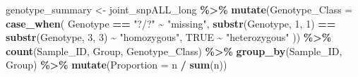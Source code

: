 \documentclass[
]{article}
\newenvironment{Shaded}{\begin{snugshade}}{\end{snugshade}}
\newcommand{\AttributeTok}[1]{\textcolor[rgb]{0.13,0.29,0.53}{#1}}
\newcommand{\ConstantTok}[1]{\textcolor[rgb]{0.56,0.35,0.01}{#1}}
\newcommand{\DecValTok}[1]{\textcolor[rgb]{0.00,0.00,0.81}{#1}}
\newcommand{\FunctionTok}[1]{\textcolor[rgb]{0.13,0.29,0.53}{\textbf{#1}}}
\newcommand{\NormalTok}[1]{#1}
\newcommand{\OtherTok}[1]{\textcolor[rgb]{0.56,0.35,0.01}{#1}}
\newcommand{\SpecialCharTok}[1]{\textcolor[rgb]{0.81,0.36,0.00}{\textbf{#1}}}
\newcommand{\StringTok}[1]{\textcolor[rgb]{0.31,0.60,0.02}{#1}}
\begin{document}
\begin{Shaded}
\begin{Highlighting}[]
\NormalTok{genotype\_summary }\OtherTok{\textless{}{-}}\NormalTok{ joint\_snpALL\_long }\SpecialCharTok{\%\textgreater{}\%}
  \FunctionTok{mutate}\NormalTok{(}\AttributeTok{Genotype\_Class =} \FunctionTok{case\_when}\NormalTok{(}
\NormalTok{    Genotype }\SpecialCharTok{==} \StringTok{"?/?"} \SpecialCharTok{\textasciitilde{}} \StringTok{"missing"}\NormalTok{,}
    \FunctionTok{substr}\NormalTok{(Genotype, }\DecValTok{1}\NormalTok{, }\DecValTok{1}\NormalTok{) }\SpecialCharTok{==} \FunctionTok{substr}\NormalTok{(Genotype, }\DecValTok{3}\NormalTok{, }\DecValTok{3}\NormalTok{) }\SpecialCharTok{\textasciitilde{}} \StringTok{"homozygous"}\NormalTok{,}
    \ConstantTok{TRUE} \SpecialCharTok{\textasciitilde{}} \StringTok{"heterozygous"}
\NormalTok{  )) }\SpecialCharTok{\%\textgreater{}\%}
  \FunctionTok{count}\NormalTok{(Sample\_ID, Group, Genotype\_Class) }\SpecialCharTok{\%\textgreater{}\%}
  \FunctionTok{group\_by}\NormalTok{(Sample\_ID, Group) }\SpecialCharTok{\%\textgreater{}\%}
  \FunctionTok{mutate}\NormalTok{(}\AttributeTok{Proportion =}\NormalTok{ n }\SpecialCharTok{/} \FunctionTok{sum}\NormalTok{(n))}


\end{Highlighting}
\end{Shaded}
\end{document}

